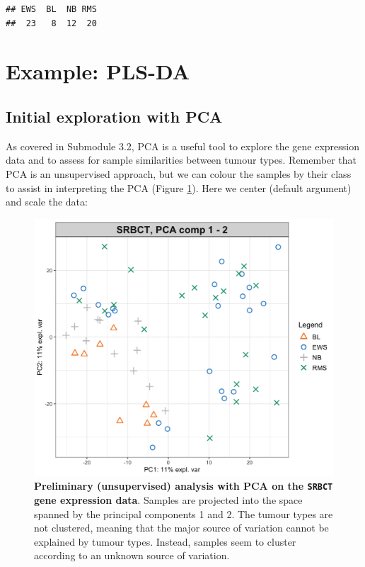 \documentclass[]{book}
\newenvironment{Shaded}{\begin{snugshade}}{\end{snugshade}}
\newcommand{\KeywordTok}[1]{\textcolor[rgb]{0.13,0.29,0.53}{\textbf{#1}}}
\newcommand{\DataTypeTok}[1]{\textcolor[rgb]{0.13,0.29,0.53}{#1}}
\newcommand{\DecValTok}[1]{\textcolor[rgb]{0.00,0.00,0.81}{#1}}
\newcommand{\StringTok}[1]{\textcolor[rgb]{0.31,0.60,0.02}{#1}}
\newcommand{\OtherTok}[1]{\textcolor[rgb]{0.56,0.35,0.01}{#1}}
\newcommand{\OperatorTok}[1]{\textcolor[rgb]{0.81,0.36,0.00}{\textbf{#1}}}
\newcommand{\NormalTok}[1]{#1}
\begin{document}
\begin{verbatim}
## EWS  BL  NB RMS 
##  23   8  12  20
\end{verbatim}

\section{Example: PLS-DA}\label{ex:plsda}

\subsection{Initial exploration with
PCA}\label{initial-exploration-with-pca}

As covered in Submodule 3.2, PCA is a useful tool to explore the gene
expression data and to assess for sample similarities between tumour
types. Remember that PCA is an unsupervised approach, but we can colour
the samples by their class to assist in interpreting the PCA (Figure
\ref{fig:plsda-pca}). Here we center (default argument) and scale the
data:

\begin{Shaded}
\end{Shaded}

\begin{figure}

{\centering \includegraphics[width=0.5\linewidth]{Figures/PLSDA/plsda-pca-1} 

}

\caption{\textbf{Preliminary (unsupervised) analysis with PCA on
the \texttt{SRBCT} gene expression data}. Samples are projected into the
space spanned by the principal components 1 and 2. The tumour types are
not clustered, meaning that the major source of variation cannot be
explained by tumour types. Instead, samples seem to cluster according to
an unknown source of variation.}\label{fig:plsda-pca}
\end{figure}
\end{document}
